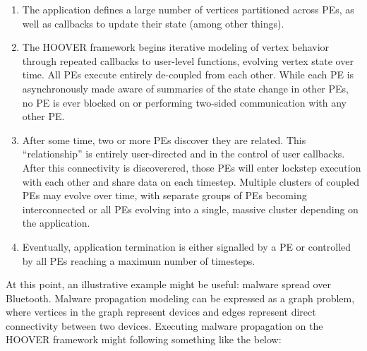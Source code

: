 \begin{enumerate}
    \item The application defines a large number of vertices partitioned across
        PEs, as well as callbacks to update their state (among other things).
    \item The HOOVER framework begins iterative modeling of vertex behavior
        through repeated callbacks to user-level functions, evolving vertex
        state over time. All PEs execute entirely de-coupled from each other.
        While each PE is asynchronously made aware of summaries of the state
        change in other PEs, no PE is ever blocked on or performing two-sided
        communication with any other PE.
    \item After some time, two or more PEs discover they are related. This
        ``relationship'' is entirely user-directed and in the control of user
        callbacks. After this connectivity is discoverered, those PEs will enter
        lockstep execution with each other and share data on each timestep.
        Multiple clusters of coupled PEs may evolve over time, with separate
        groups of PEs becoming interconnected or all PEs evolving into a single,
        massive cluster depending on the application.
    \item Eventually, application termination is either signalled by a PE or
        controlled by all PEs reaching a maximum number of timesteps.
\end{enumerate}

At this point, an illustrative example might be useful: malware spread over
Bluetooth. Malware propagation modeling can be expressed as a graph problem,
where vertices in the graph represent devices and edges represent direct
connectivity between two devices. Executing malware propagation on the
HOOVER framework might following something like the below:

